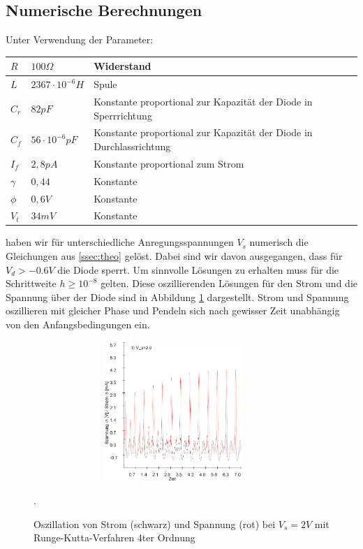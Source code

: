 \documentclass{scrartcl}
\begin{document}
\subsection{ Numerische Berechnungen } \label{ssec:num}
Unter Verwendung der Parameter:
\begin{center}
    \begin{tabular}{ | l | l | p{5cm} |}
    \hline
    $R$ & $100\Omega$ & Widerstand \\ \hline
    $L$ & $2367\cdot10^{-6} H$ & Spule \\ \hline
    $C_r$ & $82 pF$ & Konstante proportional zur Kapazität der Diode in Sperrrichtung \\ \hline
    $C_f$ & $56 \cdot10^{-6}  pF$ & Konstante proportional zur Kapazität der Diode in Durchlassrichtung \\ \hline
    $I_f$ & $2,8pA$ & Konstante proportional zum Strom  \\ \hline
    $\gamma$ & $0,44$ & Konstante \\ \hline
    $\phi$ & $0,6V$ & Konstante \\ \hline
    $V_t$ & $34mV$ & Konstante \\
    \hline
    \end{tabular}
\end{center}

haben wir für unterschiedliche Anregungsspannungen $V_s$ numerisch die Gleichungen aus  \ref{ssec:theo} gelöst. Dabei sind wir davon ausgegangen, dass für $V_d > -0.6V$ die Diode sperrt.
\newline
Um sinnvolle Lösungen zu erhalten muss für die Schrittweite $h \geq 10^{-8}$ gelten. Diese oszillierenden Lösungen für den Strom und die Spannung über der Diode sind in Abbildung \ref{fig:ldr-oszi} dargestellt. Strom und Spannung oszillieren mit gleicher Phase und Pendeln sich nach gewisser Zeit unabhängig von den Anfangsbedingungen ein.
\begin{figure}[!htbp]
\centering
\includegraphics[height=200px,width=400px]{runge-oszillation-100k-2V}
\caption{Oszillation von Strom (schwarz) und Spannung (rot) bei $V_s=2V$ mit Runge-Kutta-Verfahren 4ter Ordnung}. 
\label{fig:ldr-oszi}
\end{figure}
\end{document}
